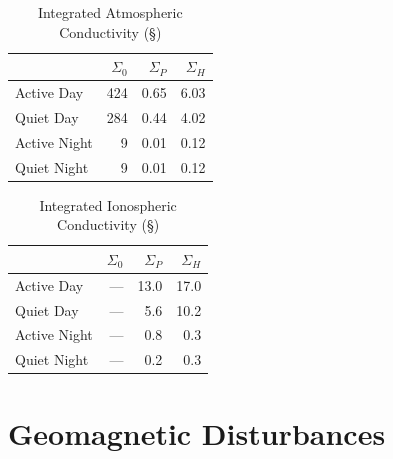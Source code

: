 \begin{longtable}{ @{\extracolsep{\fill}} lrrr @{\extracolsep{\fill}} }
  \caption[Integrated Atmospheric Conductivity]{Integrated Atmospheric Conductivity (\si{\S})}
  \label{tab_sigma_atm} \\

  \toprule
  &
  $\Sigma_0$ &
  $\Sigma_P$ &
  $\Sigma_H$ \\
  \midrule
  \endfirsthead

  \bottomrule
  \endlastfoot

  Active Day &
  424 &
  0.65 &
  6.03 \\

  Quiet Day &
  284 &
  0.44 &
  4.02 \\

  Active Night &
  9 &
  0.01 &
  0.12 \\

  Quiet Night &
  9 &
  0.01 &
  0.12 \\

\end{longtable}

\begin{longtable}{ @{\extracolsep{\fill}} lrrr @{\extracolsep{\fill}} }
  \caption[Integrated Ionospheric Conductivity]{Integrated Ionospheric Conductivity (\si{\S})}
  \label{tab_sigma_ionos} \\

  \toprule
  &
  $\Sigma_0$ &
  $\Sigma_P$ &
  $\Sigma_H$ \\
  \midrule
  \endfirsthead

  \bottomrule
  \endlastfoot

  Active Day &
  --- &
  13.0 &
  17.0 \\

  Quiet Day &
  --- &
  5.6 &
  10.2 \\

  Active Night &
  --- &
  0.8 &
  0.3 \\

  Quiet Night &
  --- &
  0.2 &
  0.3 \\

\end{longtable}

\section{Geomagnetic Disturbances}


